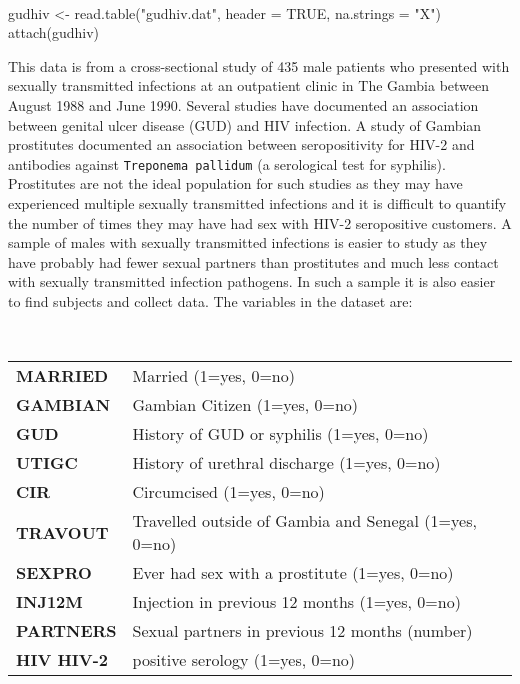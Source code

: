 \documentclass[
  12pt,
  a4paper]{book}
\newenvironment{Shaded}{\begin{snugshade}}{\end{snugshade}}
\newcommand{\AttributeTok}[1]{\textcolor[rgb]{0.77,0.63,0.00}{#1}}
\newcommand{\ConstantTok}[1]{\textcolor[rgb]{0.00,0.00,0.00}{#1}}
\newcommand{\FunctionTok}[1]{\textcolor[rgb]{0.00,0.00,0.00}{#1}}
\newcommand{\NormalTok}[1]{#1}
\newcommand{\OtherTok}[1]{\textcolor[rgb]{0.56,0.35,0.01}{#1}}
\newcommand{\StringTok}[1]{\textcolor[rgb]{0.31,0.60,0.02}{#1}}
\begin{document}
~

\begin{Shaded}
\begin{Highlighting}[]
\NormalTok{gudhiv }\OtherTok{\textless{}{-}} \FunctionTok{read.table}\NormalTok{(}\StringTok{"gudhiv.dat"}\NormalTok{, }\AttributeTok{header =} \ConstantTok{TRUE}\NormalTok{, }\AttributeTok{na.strings =} \StringTok{"X"}\NormalTok{)}
\FunctionTok{attach}\NormalTok{(gudhiv)}
\end{Highlighting}
\end{Shaded}

\newpage

This data is from a cross-sectional study of 435 male patients who presented with sexually transmitted infections at an outpatient clinic in The Gambia between August 1988 and June 1990. Several studies have documented an association between genital ulcer disease (GUD) and HIV infection. A study of Gambian prostitutes documented an association between seropositivity for HIV-2 and antibodies against \texttt{Treponema\ pallidum} (a serological test for syphilis). Prostitutes are not the ideal population for such studies as they may have experienced multiple sexually transmitted infections and it is difficult to quantify the number of times they may have had sex with HIV-2 seropositive customers. A sample of males with sexually transmitted infections is easier to study as they have probably had fewer sexual partners than prostitutes and much less contact with sexually transmitted infection pathogens. In such a sample it is also easier to find subjects and collect data. The variables in the dataset are:

~

\begin{longtable}[]{@{}
  >{\raggedright\arraybackslash}p{}
  >{\raggedright\arraybackslash}p{}@{}}
\toprule
\endhead
\textbf{MARRIED} & Married (1=yes, 0=no) \\
\textbf{GAMBIAN} & Gambian Citizen (1=yes, 0=no) \\
\textbf{GUD} & History of GUD or syphilis (1=yes, 0=no) \\
\textbf{UTIGC} & History of urethral discharge (1=yes, 0=no) \\
\textbf{CIR} & Circumcised (1=yes, 0=no) \\
\textbf{TRAVOUT} & Travelled outside of Gambia and Senegal (1=yes, 0=no) \\
\textbf{SEXPRO} & Ever had sex with a prostitute (1=yes, 0=no) \\
\textbf{INJ12M} & Injection in previous 12 months (1=yes, 0=no) \\
\textbf{PARTNERS} & Sexual partners in previous 12 months (number) \\
\textbf{HIV HIV-2} & positive serology (1=yes, 0=no) \\
\bottomrule
\end{longtable}
\end{document}
